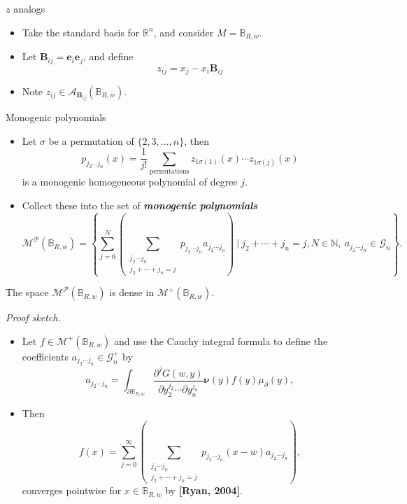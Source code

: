 \documentclass[aspectratio=169]{beamer}
\newcommand\boldgreen[1]{\textcolor{lighter_csu_green}{\emph{\textbf{#1}}}}
\newcommand\boldgold[1]{\textcolor{csu_gold}{\textbf{#1}}}
\newcommand{\R}{\mathbb{R}}
\newcommand{\algebra}{\mathcal{A}}
\newcommand{\G}{\mathcal{G}}
\newcommand{\monogenics}{\mathcal{M}}
\newcommand{\ball}{\mathbb{B}}
\newcommand{\blade}[1]{\boldsymbol{#1}}
\newcommand{\normal}{\blade{\nu}}
\newcommand{\bivector}{\blade{B}}
\begin{document}
\begin{frame}{$z$ analogs}
\vfill
\begin{itemize}
\pause
\item Take the standard basis for $\R^n$, and consider $M=\ball_{R,w}$.
\pause
\item Let $\bivector_{ij}=\blade{e}_i\blade{e}_j$, and define 
\[
z_{ij}=x_j-x_i \bivector_{ij}
\]
\pause
\item Note $z_{ij} \in \algebra_{\bivector_{ij}}(\ball_{R,w})$.
\end{itemize}
\vfill
\end{frame}

\begin{frame}{Monogenic polynomials}
\begin{itemize}
\pause

\item Let $\sigma$ be a permutation of $\{2,3,\dots,n\}$, then
\[
p_{j_2\cdots j_n}(x) = \frac{1}{j!} \sum_{\textrm{permutations}} z_{1\sigma(1)}(x)\cdots z_{1\sigma(j)}(x)
\]
is a monogenic homogeneous polynomial of degree $j$.
\pause
\item Collect these into the set of \boldgreen{monogenic polynomials}
\[
    \monogenics^\mathcal{P}(\ball_{R,w}) = \left\{\sum_{j=0}^N \left(\sum_{\substack{{j_2 \cdots j_n} \\ {j_2 + \cdots + j_n = j}}}p_{j_2 \cdots j_n}a_{j_2 \cdots j_n}\right) ~\vert~ j_2+\cdots+j_n = j, N\in \mathbb{N}, ~ a_{j_2\cdots j_n} \in \G_n\right\}.
\]
\end{itemize}
\end{frame}

\begin{frame}{}
\vfill
\begin{lemma}[Density]
The space $\monogenics^\mathcal{P}(\ball_{R,w})$ is dense in $\monogenics^+(\ball_{R,w})$.
\end{lemma}
\emph{Proof sketch.} 
\begin{itemize}
\item Let $f \in \monogenics^+(\ball_{R,w})$ and use the Cauchy integral formula to define the coefficients $a_{j_2\cdots j_n} \in \G_n^+$ by
\[
a_{j_2 \cdots j_n} = \int_{\partial \ball_{R,w}} \frac{\partial^j G(w,y)}{\partial y_2^{j_2} \cdots \partial y_n^{j_n}} \normal(y) f(y) \mu_\partial(y),
\]
\vspace*{-0.5cm}
\pause
\item Then
\[
f(x) = \sum_{j=0}^\infty \left(\sum_{\substack{{j_2 \cdots j_n} \\ {j_2 + \cdots + j_n = j}}} p_{j_2 \cdots j_n} (x-w) a_{j_2 \cdots j_n} \right),
\]
converges pointwise for $x\in \ball_{R,w}$ by \boldgold{[Ryan, 2004]}.
\end{itemize}
\vfill
\end{frame}
\end{document}

